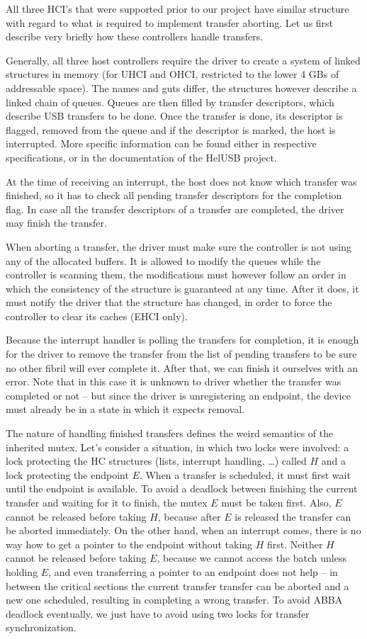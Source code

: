 All three HCI's that were supported prior to our project have similar
structure with regard to what is required to implement transfer aborting. Let us
first describe very briefly how these controllers handle transfers.

Generally, all three host controllers require the driver to create a system of
linked structures in memory (for UHCI and OHCI, restricted to the lower 4 GBs
of addressable space). The names and guts differ, the structures however
describe a linked chain of queues. Queues are then filled by transfer
descriptors, which describe USB transfers to be done. Once the transfer is
done, its descriptor is flagged, removed from the queue and if the descriptor
is marked, the host is interrupted. More specific information can be found
either in respective specifications, or in the documentation of the HelUSB
project.

At the time of receiving an interrupt, the host does not know which transfer
was finished, so it has to check all pending transfer descriptors for the
completion flag. In case all the transfer descriptors of a transfer are
completed, the driver may finish the transfer.

When aborting a transfer, the driver must make sure the controller is not using
any of the allocated buffers. It is allowed to modify the queues while the
controller is scanning them, the modifications must however follow an order in
which the consistency of the structure is guaranteed at any time. After it
does, it must notify the driver that the structure has changed, in order to
force the controller to clear its caches (EHCI only).

Because the interrupt handler is polling the transfers for completion, it is
enough for the driver to remove the transfer from the list of pending transfers
to be sure no other fibril will ever complete it. After that, we can finish it
ourselves with an error. Note that in this case it is unknown to driver whether
the transfer was completed or not -- but since the driver is unregistering an
endpoint, the device must already be in a state in which it expects removal.

The nature of handling finished transfers defines the weird semantics of the
inherited mutex. Let's consider a situation, in which two locks were involved:
a lock protecting the HC structures (lists, interrupt handling, \dots) called
$H$ and a lock protecting the endpoint $E$. When a transfer is scheduled, it
must first wait until the endpoint is available. To avoid a deadlock between
finishing the current transfer and waiting for it to finish, the mutex $E$ must
be taken first. Also, $E$ cannot be released before taking $H$, because after
$E$ is released the transfer can be aborted immediately. On the other hand, when
an interrupt comes, there is no way how to get a pointer to the endpoint without
taking $H$ first. Neither $H$ cannot be released before taking $E$, because
we cannot access the batch unless holding $E$, and even transferring a pointer
to an endpoint does not help -- in between the critical sections the current
transfer transfer can be aborted and a new one scheduled, resulting in
completing a wrong transfer. To avoid ABBA deadlock eventually, we just have to
avoid using two locks for transfer synchronization.

